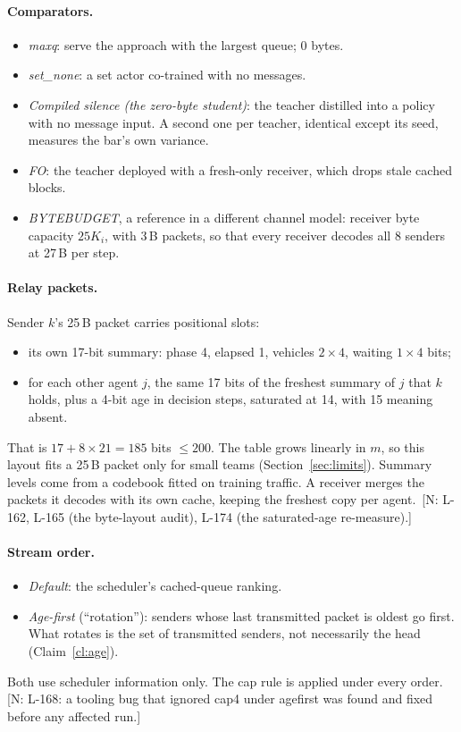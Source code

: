 \documentclass[11pt]{article}
\theoremstyle{definition}
\newif\ifshownotes\shownotestrue
\newcommand{\NOTE}[1]{\ifshownotes{\color{notecol}\,\textsf{\footnotesize[N: #1]}}\fi}
\begin{document}
\paragraph{Comparators.}
\begin{itemize}
\item \emph{maxq}: serve the approach with the largest queue; 0 bytes.
\item \emph{set\_none}: a set actor co-trained with no messages.
\item \emph{Compiled silence (the zero-byte student)}: the teacher distilled into a policy with no message input. A
second one per teacher, identical except its seed, measures the bar's own variance.
\item \emph{FO}: the teacher deployed with a fresh-only receiver, which drops stale cached blocks.
\item \emph{BYTEBUDGET}, a reference in a different channel model: receiver byte capacity $25K_i$, with 3\,B packets, so
that every receiver decodes all 8 senders at 27\,B per step.
\end{itemize}
\paragraph{Relay packets.} Sender $k$'s 25\,B packet carries positional slots:
\begin{itemize}
\item its own 17-bit summary: phase 4, elapsed 1, vehicles $2\times4$, waiting $1\times4$ bits;
\item for each other agent $j$, the same 17 bits of the freshest summary of $j$ that $k$ holds, plus a 4-bit age in
decision steps, saturated at 14, with 15 meaning absent.
\end{itemize}
That is $17+8\times21=185$ bits $\le 200$. The table grows linearly in $m$, so this layout fits a 25\,B packet only for
small teams (Section~\ref{sec:limits}). Summary levels come from a codebook fitted on training traffic. A receiver
merges the packets it decodes with its own cache, keeping the freshest copy per agent.
\NOTE{L-162, L-165 (the byte-layout audit), L-174 (the saturated-age re-measure).}
\paragraph{Stream order.}
\begin{itemize}
\item \emph{Default}: the scheduler's cached-queue ranking.
\item \emph{Age-first} (``rotation''): senders whose last transmitted packet is oldest go first. What rotates is the
set of transmitted senders, not necessarily the head (Claim~\ref{cl:age}).
\end{itemize}
Both use scheduler information only. The cap rule is applied under every order.\NOTE{L-168: a tooling bug that
ignored cap4 under agefirst was found and fixed before any affected run.}
\end{document}
